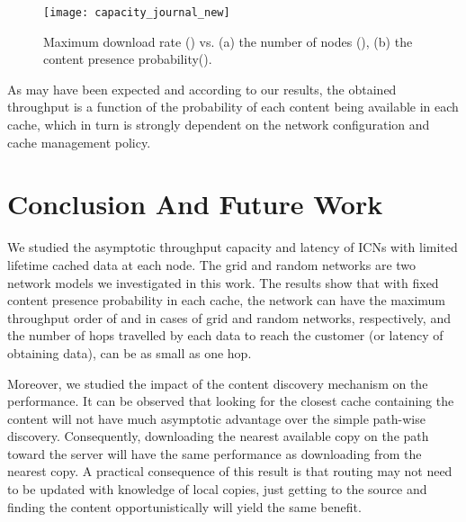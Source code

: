 \documentclass[journal]{IEEEtran}
\theoremstyle{plain}
\theoremstyle{remark}
\begin{document}
\begin{figure}[http]
    \center
\texttt{[image: capacity\_journal\_new]}\\
      \caption{Maximum download rate () vs. (a) the number of nodes (), (b) the content presence probability().}
    \label{fig:capacity}
\end{figure}

\begin{comment}
Furthermore, if the content availability increases with network growth, higher throughput capacities may be achievable. For example in scenario  if , then the resulting throughput will be  which is much higher than . However, noting that according to Theorem \ref{thm:02},  is upper bounded by some values, the achievable capacity will be upper bounded by  () and  (). 
\end{comment}

As may have been expected and according to our results, the obtained throughput is a function of the probability of each content being available in each cache, which in turn is strongly dependent on the network configuration and cache management policy. 


\section{Conclusion And Future Work}
\label{sec:conclusion}

We studied the asymptotic throughput capacity and latency of ICNs with limited lifetime cached data at each node. The grid and random networks are two network models we investigated in this work. The results show that with fixed content presence probability in each cache, the network can have the maximum throughput order of  and  in cases of grid and random networks, respectively, and the number of hops travelled by each data to reach the customer (or latency of obtaining data), can be as small as one hop. 



Moreover, we studied the impact of the content discovery mechanism on the performance. It can be observed that looking for the closest cache containing the content will not have much asymptotic advantage over the simple path-wise discovery. Consequently, downloading the nearest available copy on the path toward the server will have the same performance as downloading from the nearest copy. A practical consequence of this result is that routing may not need to be updated with knowledge of local copies, just getting to the source and finding the content opportunistically will yield the same benefit. 
\end{document}
